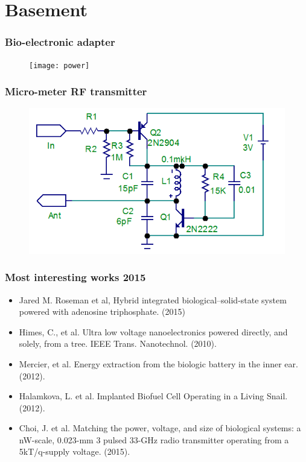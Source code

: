 \documentclass[12pt]{beamer}
\begin{document}
\section{Basement}

\begin{frame}
\frametitle{Bio-electronic adapter}
\begin{figure}
\texttt{[image: power]}
\end{figure}
\end{frame}



\begin{frame}
\frametitle{Micro-meter RF transmitter}
\begin{figure}
\includegraphics[width=0.8\linewidth]{transmitter}
\end{figure}
\end{frame}


\begin{frame}
\frametitle{Most interesting works 2015}
\begin{itemize}
\item Jared M. Roseman et al, Hybrid integrated biological–solid-state system powered with adenosine triphosphate. (2015)
\item Himes, C., et al. Ultra low voltage nanoelectronics powered directly, and solely, from a tree. IEEE Trans. Nanotechnol. (2010).
\item Mercier, et al. Energy extraction from the biologic battery in the inner ear. (2012).
\item Halamkova, L. et al. Implanted Biofuel Cell Operating in a Living Snail. (2012).
\item Choi, J. et al. Matching the power, voltage, and size of biological systems: a nW-scale, 0.023-mm 3 pulsed 33-GHz radio transmitter operating from a 5kT/q-supply voltage. (2015).
\end{itemize}
\end{frame}

\end{document}
